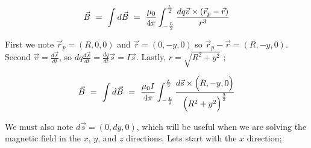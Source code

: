\documentclass{article}
\begin{document}
\begin{equation} \label{eq:51}
\vec{B} \hspace{0.125cm} = \hspace{0.125cm} \int d \vec{B} \hspace{0.125cm} = \hspace{0.125cm} \frac{\mu_{0}}{4 \pi} \int_{-\frac{L}{2}}^{\frac{L}{2}} \frac{dq \vec{v} \times (\vec{r}_{p} - \vec{r})}{r^3}
\end{equation}

First we note \begin{math} \vec{r}_p = (R, 0, 0) \end{math} and \begin{math} \vec{r} = (0, -y, 0) \end{math} so \begin{math} \vec{r}_{p} - \vec{r} = (R, -y, 0) \end{math}. Second \begin{math} \vec{v} = \frac{d \vec{s}}{dt} \end{math}, so \begin{math} dq \frac{d \vec{s}}{dt} = \frac{dq}{dt} \vec{s} = I \vec{s} \end{math}. Lastly, \begin{math} r = \sqrt{ R^2 + y^2} \end{math} ;

\begin{equation} \label{eq:51}
\vec{B} \hspace{0.125cm} = \hspace{0.125cm} \int d \vec{B} \hspace{0.125cm} = \hspace{0.125cm} \frac{\mu_{0} I}{4 \pi} \int_{-\frac{L}{2}}^{\frac{L}{2}} \frac{d \vec{s} \times \Big(R, -y, 0 \Big)}{\Big( R^2 + y^2 \Big)^\frac{3}{2}}
\end{equation}

We must also note \begin{math} d \vec{s} = (0, dy, 0) \end{math}, which will be useful when we are solving the magnetic field in the \begin{math} x \end{math}, \begin{math} y \end{math}, and \begin{math} z \end{math} directions. Lets start with the \begin{math} x \end{math} direction;
\end{document}
